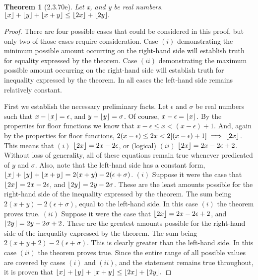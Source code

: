 \documentclass[a4paper, 12pt]{article}
\theoremstyle{plain}
\newtheorem*{theorem*}{Theorem}
\DeclarePairedDelimiter{\floor}{\lfloor}{\rfloor}
\begin{document}
	
	\begin{theorem*}[2.3.70e]
		Let x, and y be real numbers. $\floor{x} + \floor{y} + \floor{x + y} \le \floor{2x} + \floor{2y}.$
	\end{theorem*}
	
	\begin{proof}
		There are four possible cases that could be considered in this proof, but only two of those cases require consideration. Case $(i)$ demonstrating the minimum possible amount occurring on the right-hand side will establish truth for equality expressed by the theorem. Case $(ii)$ demonstrating the maximum possible amount occurring on the right-hand side will establish truth for inequality expressed by the theorem. In all cases the left-hand side remains relatively constant.
		
		First we establish the necessary preliminary facts. Let $\epsilon$ and $\sigma$ be real numbers such that $x - \floor{x} = \epsilon$, and $y - \floor{y} = \sigma$. Of course, $x - \epsilon = \floor{x}$. By the properties for floor functions we know that $x-\epsilon \le x < (x - \epsilon) + 1$. And, again by the properties for floor functions,
		$2(x-\epsilon) \le 2x < 2[(x - \epsilon) + 1] \implies \floor{2x}$. This means that $(i)$ 
		$\floor{2x} = 2x-2\epsilon$, or (logical) $(ii)$ $\floor{2x} = 2x - 2\epsilon + 2$. Without loss of generality, all of these equations remain true whenever predicated of $y$ and $\sigma$. Also, note that the left-hand side has a constant form, $\floor{x} + \floor{y} + \floor{x + y} = 2(x + y) - 2(\epsilon + \sigma)$.
		\newline
		\newline
		\indent $(i)$ Suppose it were the case that $\floor{2x} = 2x-2\epsilon$, and $\floor{2y} = 2y-2\sigma$. \indent These are the least amounts possible for the right-hand side of the \newline \indent inequality expressed by the theorem. The sum being $2(x + y) - 2(\epsilon + \sigma)$, \indent equal to the left-hand side. In this case $(i)$ the theorem proves true.
		\newline
		\newline
		\indent $(ii)$ Suppose it were the case that $\floor{2x} = 2x - 2\epsilon + 2$, and \newline \indent $\floor{2y} = 2y - 2\sigma + 2$. These are the greatest amounts possible for the \indent right-hand side of the inequality expressed by the theorem. The sum \newline \indent being $2(x + y + 2) - 2(\epsilon + \sigma)$. This is clearly greater than the left-hand \indent side. In this case $(ii)$ the theorem proves true.
		\newline
		\newline
		Since the entire range of all possible values are covered by cases $(i)$ and $(ii)$, and the statement remains true throughout, it is proven that \newline $\floor{x} + \floor{y} + \floor{x + y} \le \floor{2x} + \floor{2y}.$
	\end{proof}
\end{document}

